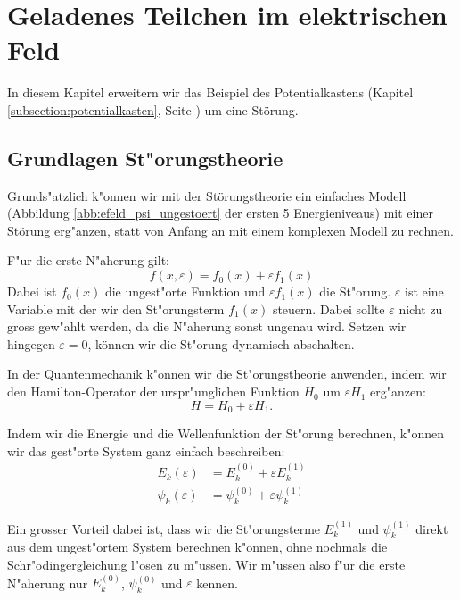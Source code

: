 \chapter{Geladenes Teilchen im elektrischen Feld\label{chapter:efeld}}
\begin{refsection}



In diesem Kapitel erweitern wir das Beispiel des Potentialkastens 
(Kapitel \ref{subsection:potentialkasten}, Seite \pageref{subsection:potentialkasten})
um eine St\"orung.

\section{Grundlagen St"orungstheorie}
Grunds"atzlich k"onnen wir mit der St\"orungstheorie ein einfaches Modell 
(Abbildung \ref{abb:efeld_psi_ungestoert} der ersten 5 Energieniveaus) 
mit einer St\"orung erg"anzen, statt von Anfang an mit einem komplexen Modell zu rechnen.

F"ur die erste N"aherung gilt:
\[
  f(x, \varepsilon) = f_0(x) + \varepsilon f_1(x)
\]
Dabei ist $f_0(x)$ die ungest"orte Funktion und $\varepsilon f_1(x)$ die St"orung.
$\varepsilon$ ist eine Variable mit der wir den St"orungsterm $f_1(x)$ steuern.
Dabei sollte $\varepsilon$ nicht zu gross gew"ahlt werden,
da die N"aherung sonst ungenau wird.
Setzen wir hingegen $\varepsilon = 0$, k\"onnen wir die St"orung dynamisch abschalten.




In der Quantenmechanik k"onnen wir die St"orungstheorie anwenden,
indem wir den Hamilton-Operator der urspr"unglichen Funktion $H_0$
um $\varepsilon H_1$ erg"anzen:
\[
  H = H_0 + \varepsilon H_1.
\]

Indem wir die Energie und die Wellenfunktion der St"orung berechnen, k"onnen wir das gest"orte System ganz einfach beschreiben:
\begin{equation}
\begin{aligned}
E_k(\varepsilon)&=E_k^{(0)} + \varepsilon E_k^{(1)}
\\
\psi_k(\varepsilon)&=\psi_k^{(0)} + \varepsilon \psi_k^{(1)}
\end{aligned}
\end{equation}

Ein grosser Vorteil dabei ist,
dass wir die St"orungsterme $E_k^{(1)}$ und $\psi_k^{(1)}$
direkt aus dem ungest"ortem System berechnen k"onnen,
ohne nochmals die Schr"odingergleichung l"osen zu m"ussen.
Wir m"ussen also f"ur die erste N"aherung nur $E_k^{(0)}$,
$\psi_k^{(0)}$ und $\varepsilon$ kennen.





\end{refsection}
